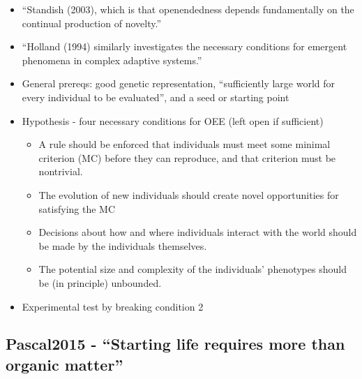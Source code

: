 		\begin{itemize}
			\item
			
			``Standish (2003), which is that openendedness depends fundamentally
			on the continual production of novelty.''
			
			\item
			
			``Holland (1994) similarly investigates the necessary conditions for
			emergent phenomena in complex adaptive systems.''
			
			\item
			
			General prereqs: good genetic representation, ``sufficiently large
			world for every individual to be evaluated'', and a seed or starting
			point
			
			\item
			
			Hypothesis - four necessary conditions for OEE (left open if
			sufficient)
			
			
			\begin{itemize}
				\item
				
				A rule should be enforced that individuals must meet some minimal
				criterion (MC) before they can reproduce, and that criterion must be
				nontrivial.
				
				\item
				
				The evolution of new individuals should create novel opportunities
				for satisfying the MC
				
				\item
				
				Decisions about how and where individuals interact with the world
				should be made by the individuals themselves.
				
				\item
				
				The potential size and complexity of the individuals' phenotypes
				should be (in principle) unbounded.
				
			\end{itemize}
			\item
			
			Experimental test by breaking condition 2
			
		\end{itemize}
		
		\hypertarget{pascal2015---starting-life-requires-more-than-organic-matter}{\subsection{Pascal2015
				- ``Starting life requires more than organic
				matter''}\label{pascal2015---starting-life-requires-more-than-organic-matter}}
		
